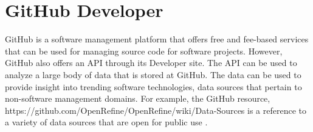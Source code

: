 \section{GitHub Developer}

GitHub is a software management platform that offers free and fee-based
services that can be used for managing source code for software projects.
However, GitHub also offers an API through its Developer site.  The API
can be used to analyze a large body of data that is stored at GitHub.  The
data can be used to provide insight into trending software technologies, data
sources that pertain to non-software management domains.  For example, the
GitHub resource, https://github.com/OpenRefine/OpenRefine/wiki/Data-Sources is
a reference to a variety of data sources that are open for public use
\cite{GitHub.com2018}.
